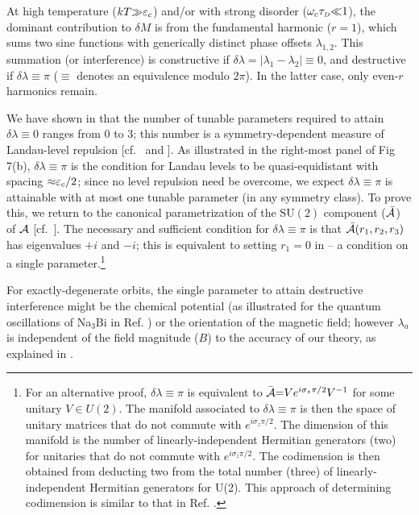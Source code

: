 \documentclass[aps, showpacs, twocolumn, notitlepage, superscriptaddress]{revtex4-1}
\begin{document}
At high temperature ($kT{\gg}\varepsilon_c$) and/or with strong disorder ($\omega_c\tau_{\scriptscriptstyle{D}}{\ll}1$), the dominant contribution to $\delta M$ is from the fundamental harmonic ($r{=}1$), which sums two sine functions with generically distinct phase offsets $\lambda_{1,2}$. This summation (or interference) is constructive if $\delta \lambda{=}|\lambda_1{-}\lambda_2|{\equiv}0$, and destructive if $\delta \lambda{\equiv}\pi$  ($\equiv$ denotes an equivalence modulo $2\pi$). In the latter case, only even-$r$ harmonics remain.

We have shown in  that  the number of tunable parameters required to attain  $\delta \lambda{\equiv}0$ ranges from $0$ to $3$; this number is a symmetry-dependent measure of Landau-level repulsion [cf.\  and ]. As illustrated in the right-most panel of Fig 7(b), $\delta \lambda{\equiv}\pi$ is the condition  for Landau levels to be quasi-equidistant  with spacing ${\approx}\varepsilon_c/2$; since no level repulsion need be overcome,
we expect $\delta \lambda{\equiv}\pi$ is attainable with at most one tunable parameter (in any symmetry class). To prove this, we return to the canonical parametrization of the $\text{SU}(2)$ component (${\cal \bar{A}}$) of ${\cal A}$ [cf.\ ]. The necessary and sufficient condition for $\delta \lambda{\equiv}\pi$ is that ${\cal \bar{A}}(r_1,r_2,r_3)$ has eigenvalues $+i$ and $-i$; this is equivalent to setting $r_1{=}0$ in  -- a condition on a single parameter.\footnote{For an alternative proof,  $\delta \lambda{\equiv}\pi$ is equivalent to ${ \bar{\cal A}}{=}Ve^{i\sigma_z\pi/2}V^{-1}$ for some unitary $V\in U(2)$. The manifold associated to $\delta \lambda{\equiv}\pi$ is then the space of unitary matrices  that do not commute with $e^{i\sigma_z\pi/2}$. The dimension of this manifold is the number of linearly-independent Hermitian generators (two) for unitaries that do not commute with $e^{i\sigma_z\pi/2}$. The codimension is then obtained from deducting two from the total number (three)  of linearly-independent Hermitian generators  for U(2). This approach of determining codimension is similar to that in Ref. .} 

For exactly-degenerate orbits, the single parameter to attain destructive interference might be the chemical potential (as illustrated for the quantum oscillations of Na$_3$Bi in Ref. ) or the orientation of the magnetic field; however $\lambda_a$ is independent of the field magnitude ($B$) to the accuracy\cite{rothmag,fuchs_landau_2018,gao_zero-field_2017,fischbeck_review} of our theory, as explained in . 
\end{document}
